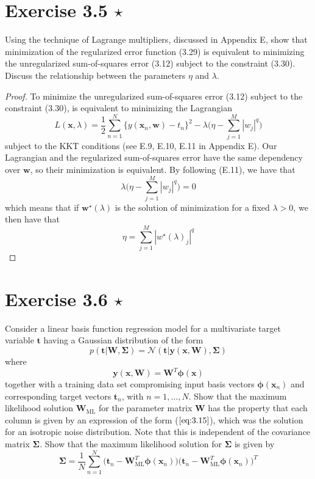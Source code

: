 \section*{Exercise 3.5 $\star$}
Using the technique of Lagrange multipliers, discussed in Appendix E,
show that minimization of the regularized error function (3.29)
is equivalent to minimizing the unregularized sum-of-squares error (3.12)
subject to the constraint (3.30). Discuss the relationship
between the parameters $\eta$ and $\lambda$.

\begin{proof}
    To minimize the unregularized sum-of-squares error (3.12) subject to
    the constraint (3.30), is equivalent to minimizing the Lagrangian
    \[
        L(\mathbf{x}, \lambda) = 
        \frac{1}{2}\sum_{n=1}^{N} \{y(\mathbf{x}_n, \mathbf{w}) - t_n\}^2 
        - \lambda\bigg(\eta - \sum_{j=1}^{M} |w_j|^q\bigg)
    \] subject to the KKT conditions (see E.9, E.10, E.11 in Appendix E).
    Our Lagrangian and the regularized sum-of-squares error have the same
    dependency over $\mathbf{w}$, so their minimization is equivalent.
    By following (E.11), we have that
     \[
         \lambda\bigg(\eta - \sum_{j=1}^{M} |w_j|^q\bigg) = 0
    \] 
    which means that if $\mathbf{w}^\star(\lambda)$ is the solution of minimization
    for a fixed $\lambda > 0$, we then have that 
     \[
         \eta = \sum_{j=1}^{M} |w^\star(\lambda)_j|^q
    \] 
\end{proof}

\section*{Exercise 3.6 $\star$}
Consider a linear basis function regression model
for a multivariate target variable $\mathbf{t}$ having 
a Gaussian distribution of the form
\begin{equation}\label{eq:3.107}\tag{3.107}
    p(\mathbf{t} | \mathbf{W}, \mathbf{\Sigma})
    = \mathcal{N}(\mathbf{t} | \mathbf{y}(\mathbf{x}, \mathbf{W}), \mathbf{\Sigma})
\end{equation}
where 
\begin{equation}\label{eq:3.108}\tag{3.108}
    \mathbf{y}(\mathbf{x}, \mathbf{W}) = \mathbf{W}^T \bm{\phi}(\mathbf{x})
\end{equation}
together with a training data set compromising input
basis vectors $\bm{\phi}(\mathbf{x}_n)$ and corresponding
target vectors $\mathbf{t}_n$, with $n = 1, \ldots, N$. Show
that the maximum likelihood solution $\mathbf{W}_{\text{ML}}$ for
the parameter matrix $\mathbf{W}$ has the property that each 
column is given by an expression of the form ($\ref{eq:3.15}$),
which was the solution for an isotropic noise distribution.
Note that this is independent of the covariance matrix
$\mathbf{\Sigma}$. Show that the maximum likelihood solution
for $\mathbf{\Sigma}$ is given by
\begin{equation}\label{eq:3.109}\tag{3.109}
    \mathbf{\Sigma} = \frac{1}{N} \sum_{n=1}^{N} 
    \big(\mathbf{t}_n - \mathbf{W}_{\text{ML}}^T\bm{\phi}(\mathbf{x}_n)\big)
    \big(\mathbf{t}_n - \mathbf{W}_{\text{ML}}^T\bm{\phi}(\mathbf{x}_n)\big)^T
\end{equation}

